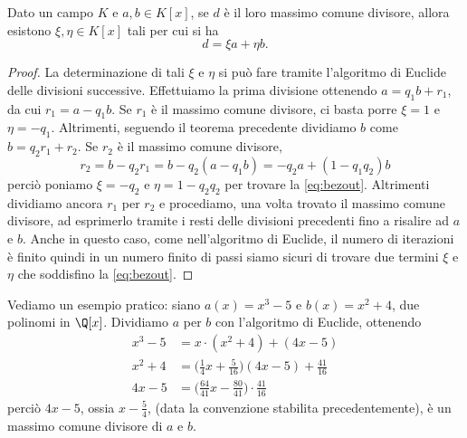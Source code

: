 \begin{teorema} \label{t:bezout}
	Dato un campo $K$ e $a,b\in K[x]$, se $d$ è il loro massimo comune divisore, allora esistono $\xi,\eta\in K[x]$ tali per cui si ha
	\begin{equation}
		d=\xi a+\eta b.
		\label{eq:bezout}
	\end{equation}
\end{teorema}
\begin{proof}
	La determinazione di tali $\xi$ e $\eta$ si può fare tramite l'algoritmo di Euclide delle divisioni successive.
	Effettuiamo la prima divisione ottenendo $a=q_1b+r_1$, da cui $r_1=a-q_1b$.
	Se $r_1$ è il massimo comune divisore, ci basta porre $\xi=1$ e $\eta=-q_1$.
	Altrimenti, seguendo il teorema precedente dividiamo $b$ come $b=q_2r_1+r_2$.
	Se $r_2$ è il massimo comune divisore,
	\begin{equation}
		r_2=b-q_2r_1=b-q_2(a-q_1b)=-q_2a+(1-q_1q_2)b
	\end{equation}
	perciò poniamo $\xi=-q_2$ e $\eta=1-q_2q_2$ per trovare la \eqref{eq:bezout}.
	Altrimenti dividiamo ancora $r_1$ per $r_2$ e procediamo, una volta trovato il massimo comune divisore, ad esprimerlo tramite i resti delle divisioni precedenti fino a risalire ad $a$ e $b$.
	Anche in questo caso, come nell'algoritmo di Euclide, il numero di iterazioni è finito quindi in un numero finito di passi siamo sicuri di trovare due termini $\xi$ e $\eta$ che soddisfino la \eqref{eq:bezout}.
\end{proof}
Vediamo un esempio pratico: siano $a(x)=x^3-5$ e $b(x)=x^2+4$, due polinomi in $\Q[x]$.
Dividiamo $a$ per $b$ con l'algoritmo di Euclide, ottenendo
\begin{equation*}
	\begin{aligned}
		x^3-5&=x\cdot(x^2+4)+(4x-5)\\
		x^2+4&=\Big(\frac14x+\frac5{16}\Big)(4x-5)+\frac{41}{16}\\
		4x-5&=\Big(\frac{64}{41}x-\frac{80}{41}\Big)\cdot\frac{41}{16}
	\end{aligned}
\end{equation*}
perciò $4x-5$, ossia $x-\frac54$, (data la convenzione stabilita precedentemente), è un massimo comune divisore di $a$ e $b$.
